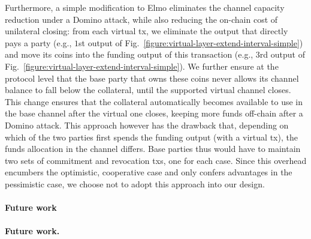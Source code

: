 Furthermore, a simple modification to Elmo eliminates the channel capacity
reduction under a Domino attack, while also reducing the on-chain
cost of unilateral closing: from each virtual tx, we
eliminate the output that directly
pays a party (e.g., $1$st output of
Fig.~\ref{figure:virtual-layer-extend-interval-simple}) and move its coins into
the funding output of this transaction (e.g., $3$rd
output of Fig.~\ref{figure:virtual-layer-extend-interval-simple}). We further
ensure at the protocol level that the base party that owns these coins never
allows its channel balance to fall below the collateral, until the supported
virtual channel closes. This change ensures that the collateral
automatically becomes available to use in the base channel after the virtual one
closes, keeping more funds off-chain after a Domino attack. This approach
however has the drawback that, depending on which of the two parties first
spends the funding output (with a virtual tx), the funds allocation in the
channel differs. Base parties thus would have to maintain two sets of commitment
and revocation txs, one for each case. Since this overhead encumbers the
optimistic, cooperative case and only confers advantages in the pessimistic
case, we choose not to adopt this approach into our design.

\makeatletter%
%
  {\paragraph{Future work}}%
  {\paragraph{Future work.}}%
\makeatother%


